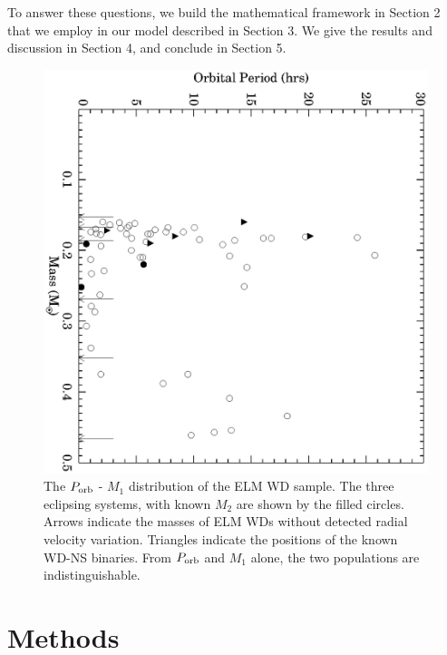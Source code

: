\documentclass[apjl]{emulateapj}
\begin{document}
To answer these questions, we build the mathematical framework in Section 2 that we employ in our model described in Section 3. We give the results and discussion in Section 4, and conclude in Section 5.

\begin{figure}[h!]
\begin{center}
\includegraphics[angle=90,width=0.95\columnwidth]{Porb_M1.eps}
\caption{The $P_{\rm orb}$ - $M_1$ distribution of the ELM WD sample. The three eclipsing systems, with known $M_2$ are shown by the filled circles. Arrows indicate the masses of ELM WDs without detected radial velocity variation. Triangles indicate the positions of the known WD-NS binaries. From $P_{\rm orb}$ and $M_1$ alone, the two populations are indistinguishable.}
\end{center}
\end{figure}




\section{Methods}
\end{document}
